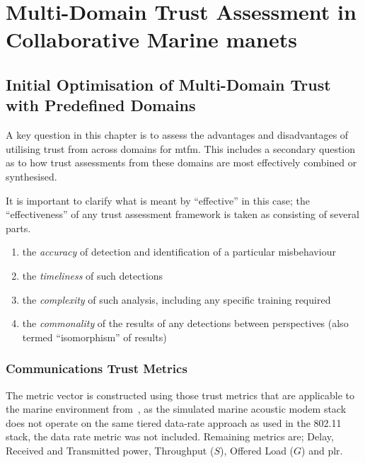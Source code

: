 \def\ChapterTitle{}

\chapter{Multi-Domain Trust Assessment in Collaborative Marine \glspl{manet}}
\label{ch:multi_domain}

\section{Initial Optimisation of Multi-Domain Trust with Predefined Domains}

A key question in this chapter is to assess the advantages and disadvantages of utilising trust from across domains for \gls{mtfm}. 
This includes a secondary question as to how trust assessments from these domains are most effectively combined or synthesised. 

It is important to clarify what is meant by ``effective'' in this case; the ``effectiveness'' of any trust assessment framework is taken as consisting of several parts.

\begin{enumerate}
  \item the \emph{accuracy} of detection and identification of a particular misbehaviour
  \item the \emph{timeliness} of such detections
  \item the \emph{complexity} of such analysis, including any specific training required
  \item the \emph{commonality} of the results of any detections between perspectives (also termed ``isomorphism'' of results)
\end{enumerate}



\subsection{Communications Trust Metrics}

The metric vector is constructed using those trust metrics that are applicable to the marine environment from~\cite{Guo2012}, as the simulated marine acoustic modem stack does not operate on the same tiered data-rate approach as used in the 802.11 stack, the data rate metric was not included. Remaining metrics are; Delay, Received and Transmitted power, Throughput ($S$), Offered Load ($G$) and \gls{plr}.

